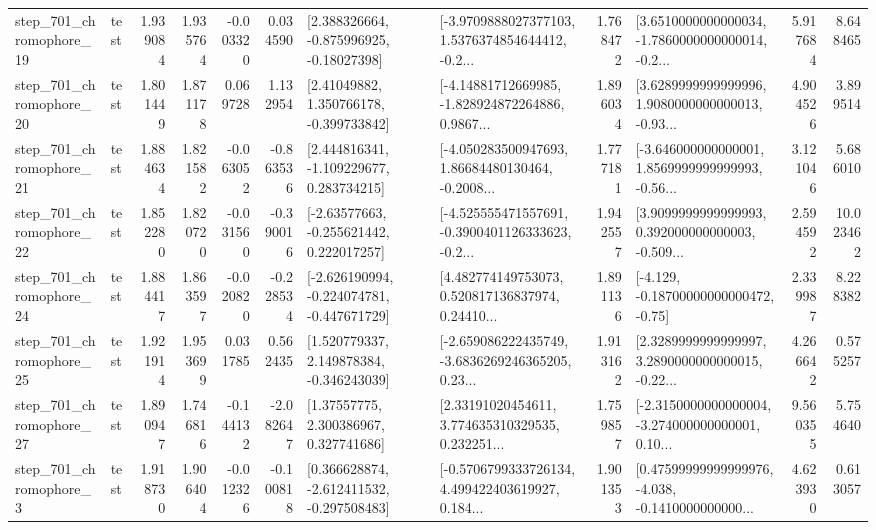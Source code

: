 \begin{tabular}{llrrrrllrlrr}
  step\_701\_chromophore\_19 &      test &      1.939084 &    1.935764 &     -0.003320 &  0.034590 &    [2.388326664, -0.875996925, -0.18027398] &  [-3.9709888027377103, 1.5376374854644412, -0.2... &       1.768472 &  [3.6510000000000034, -1.7860000000000014, -0.2... &            5.917684 &          8.648465 \\
  step\_701\_chromophore\_20 &      test &      1.801449 &    1.871178 &      0.069728 &  1.132954 &     [2.41049882, 1.350766178, -0.399733842] &  [-4.14881712669985, -1.828924872264886, 0.9867... &       1.896034 &  [3.6289999999999996, 1.9080000000000013, -0.93... &            4.904526 &          3.899514 \\
  step\_701\_chromophore\_21 &      test &      1.884634 &    1.821582 &     -0.063052 & -0.863536 &    [2.444816341, -1.109229677, 0.283734215] &  [-4.050283500947693, 1.86684480130464, -0.2008... &       1.777181 &  [-3.646000000000001, 1.8569999999999993, -0.56... &            3.121046 &          5.686010 \\
  step\_701\_chromophore\_22 &      test &      1.852280 &    1.820720 &     -0.031560 & -0.390016 &    [-2.63577663, -0.255621442, 0.222017257] &  [-4.525555471557691, -0.3900401126333623, -0.2... &       1.942557 &  [3.9099999999999993, 0.392000000000003, -0.509... &            2.594592 &         10.023462 \\
  step\_701\_chromophore\_24 &      test &      1.884417 &    1.863597 &     -0.020820 & -0.228534 &  [-2.626190994, -0.224074781, -0.447671729] &  [4.482774149753073, 0.520817136837974, 0.24410... &       1.891136 &              [-4.129, -0.18700000000000472, -0.75] &            2.339987 &          8.228382 \\
  step\_701\_chromophore\_25 &      test &      1.921914 &    1.953699 &      0.031785 &  0.562435 &    [1.520779337, 2.149878384, -0.346243039] &  [-2.659086222435749, -3.6836269246365205, 0.23... &       1.913162 &  [2.3289999999999997, 3.2890000000000015, -0.22... &            4.266642 &          0.575257 \\
  step\_701\_chromophore\_27 &      test &      1.890947 &    1.746816 &     -0.144132 & -2.082647 &      [1.37557775, 2.300386967, 0.327741686] &  [2.33191020454611, 3.774635310329535, 0.232251... &       1.759857 &  [-2.3150000000000004, -3.274000000000001, 0.10... &            9.560355 &          5.754640 \\
   step\_701\_chromophore\_3 &      test &      1.918730 &    1.906404 &     -0.012326 & -0.100818 &   [0.366628874, -2.612411532, -0.297508483] &  [-0.5706799333726134, 4.499422403619927, 0.184... &       1.901353 &  [0.47599999999999976, -4.038, -0.1410000000000... &            4.623930 &          0.613057 \\

\end{tabular}
